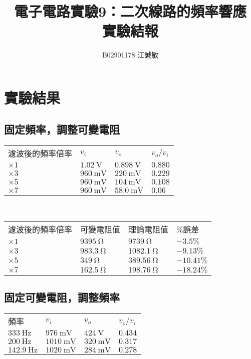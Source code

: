 \documentclass[12pt, a4paper]{article}
\title{ \bf {\Huge 電子電路實驗9：二次線路的頻率響應}\\ 實驗結報}
\author{B02901178 江誠敏}
\begin{document}
\maketitle


\section{實驗結果}

\subsection{固定頻率，調整可變電阻}
\begin{center}
  \begin{tabular}{p{3.5cm}p{2.5cm}p{2.5cm}p{2.5cm}}
    \hline
    濾波後的頻率倍率 & $v_i$ & $v_o$ & $v_o/v_i$  \\
    \hhline{====}
    $\times 1$ & $\SI{1.02}{\V}$ & $\SI{0.898}{\V}$ & $0.880$  \\
    $\times 3$ & $\SI{960}{\mV}$ & $\SI{220}{\mV}$ & $0.229$  \\
    $\times 5$ & $\SI{960}{\mV}$ & $\SI{104}{\mV}$ & $0.108$ \\
    $\times 7$ & $\SI{960}{\mV}$ & $\SI{58.0}{\mV}$ & $0.06$  \\
    \hline
  \end{tabular} \\[10pt]
  \begin{tabular}{p{3.5cm}p{2.5cm}p{2.5cm}p{2.5cm}}
    \hline
    濾波後的頻率倍率 & 可變電阻值 & 理論電阻值 & \%誤差 \\
    \hhline{====}
    $\times 1$ & $\SI{9395}{\ohm}$ & $\SI{9739}{\ohm}$ & $-3.5 \%$\\
    $\times 3$ & $\SI{983.3}{\ohm}$ & $\SI{1082.1}{\ohm}$ & $-9.13 \%$\\
    $\times 5$ & $\SI{349}{\ohm}$ & $\SI{389.56}{\ohm}$ & $-10.41 \%$\\
    $\times 7$ & $\SI{162.5}{\ohm}$ & $\SI{198.76}{\ohm}$ & $-18.24 \%$\\
    \hline
  \end{tabular}
\end{center}

\subsection{固定可變電阻，調整頻率}
\begin{center}
  \begin{tabular}{p{3.5cm}p{2.5cm}p{2.5cm}p{2.5cm}}
    \hline
    頻率 & $v_i$ & $v_o$ & $v_o/v_i$ \\
    \hhline{====}
    $\SI{333}{\Hz}$ & $\SI{976}{\mV}$ & $\SI{424}{\V}$ & $0.434$  \\
    $\SI{200}{\Hz}$ & $\SI{1010}{\mV}$ & $\SI{320}{\mV}$ & $0.317$  \\
    $\SI{142.9}{\Hz}$ & $\SI{1020}{\mV}$ & $\SI{284}{\mV}$ & $0.278$ \\
    \hline
  \end{tabular}
\end{center}
\end{document}
